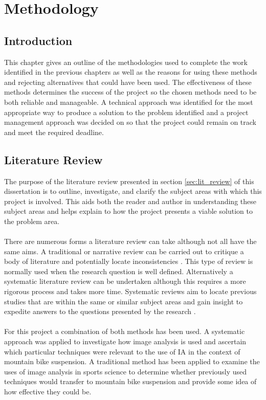 \section{Methodology}
	\subsection{Introduction}
		This chapter gives an outline of the methodologies used to complete the work identified in the previous chapters as well as the reasons for using these methods and rejecting alternatives that  could have been used. The effectiveness of these methods  determines the success of the project so the chosen methods need  to be both reliable and manageable. A technical approach was identified for the most appropriate way to produce a solution to the problem identified and a project management approach was decided on so that the project could remain on track and meet the required deadline.
	\subsection{Literature Review}
		The purpose of the literature review presented in section \ref{sec:lit_review} of this dissertation is to outline, investigate, and clarify the subject areas with which this project is involved. This aids both the reader and author in understanding these subject areas and helps  explain to how the project presents a viable solution to the problem area.
		\\\\
		There are numerous  forms a literature review can take although not all have the same aims. A traditional or narrative review can be carried out to critique a body of literature and potentially locate inconsistencies . This type of review is normally used when the research question is well defined. Alternatively a systematic literature review can be undertaken although  this requires a more rigorous process and takes more time. Systematic reviews aim to locate previous studies that are within the same or similar subject areas and gain insight  to expedite answers to the questions presented by the research .
		\\\\
		For this project a combination of both methods  has been used. A systematic approach was applied to investigate  how image analysis is used and ascertain which particular techniques were relevant  to the use of IA in the context of mountain bike suspension. A traditional method has been applied to examine the uses of image analysis in sports science to determine whether  previously used techniques would transfer to mountain bike suspension and provide  some  idea of how effective they could be.
